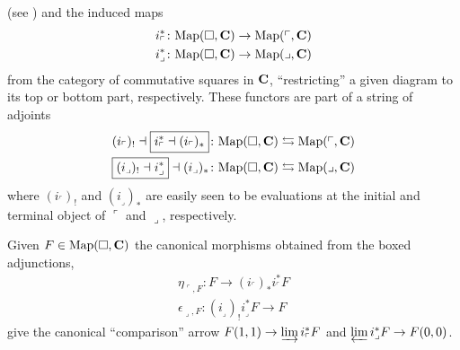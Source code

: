 (see \cite[Notation \textbf{1.2.8.4}]{HTT}) and the induced maps
\begin{gather}
i_\ulcorner^*\colon \text{Map}(\square, \textbf{C}) \to \text{Map}(\ulcorner,\textbf{C})\\
i_\lrcorner^*\colon \text{Map}(\square, \textbf{C}) \to \text{Map}(\lrcorner,\textbf{C})
\end{gather}
from the category of commutative squares in $\textbf{C}$, ``restricting'' a given diagram to its top or bottom part, respectively. These functors are part of a string of adjoints
\begin{gather}
(i_\ulcorner)_! \dashv \boxed{i_\ulcorner^* \dashv (i_\ulcorner)_*}\colon \text{Map}(\square,\textbf{C})\leftrightarrows \text{Map}(\ulcorner,\textbf{C})\\
\boxed{(i_\lrcorner)_! \dashv i_\lrcorner^*} \dashv (i_\lrcorner)_*\colon \text{Map}(\square,\textbf{C})\leftrightarrows \text{Map}(\lrcorner,\textbf{C})
\end{gather}
where $(i_\ulcorner)_!$ and $(i_\lrcorner)_*$ are easily seen to be evaluations at the initial and terminal object of $\ulcorner$ and $\lrcorner$, respectively. 

Given $F\in \text{Map}(\square, \textbf{C})$ the canonical morphisms obtained from the boxed adjunctions,
\begin{gather*}
\eta_{\ulcorner, F}\colon F\to (i_\ulcorner)_*i_\ulcorner^* F\\
\epsilon_{\lrcorner, F}\colon (i_\lrcorner)_!  i_\lrcorner^*F\to F
\end{gather*}
give the canonical ``comparison'' arrow $F(1,1) \to \varinjlim i_\ulcorner^* F$ and $\varprojlim i_\lrcorner^*F\to F(0,0)$.

